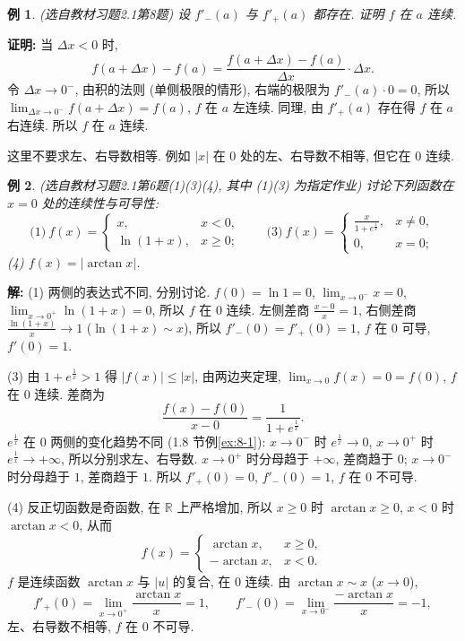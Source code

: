 \documentclass[UTF8,openany]{ctexbook}
\theoremstyle{chinesetextbook}
\newtheorem{example}{例}[section]
\newenvironment{cnproof}{\par\indent\textbf{证明:} \ignorespaces}{\par}
\newenvironment{cnsolution}{\par\indent\textbf{解:} \ignorespaces}{\par}
\begin{document}
\begin{example}\label{ex:c2-h1-8}
\textnormal{(选自教材习题2.1第8题)} 设 $f'_-(a)$ 与 $f'_+(a)$ 都存在. 证明 $f$ 在 $a$ 连续.
\end{example}
\begin{cnproof}
当 $\Delta x<0$ 时,
\[
f(a+\Delta x)-f(a)=\frac{f(a+\Delta x)-f(a)}{\Delta x}\cdot\Delta x.
\]
令 $\Delta x\to0^-$, 由积的法则 (单侧极限的情形), 右端的极限为 $f'_-(a)\cdot0=0$, 所以 $\displaystyle\lim_{\Delta x\to0^-}f(a+\Delta x)=f(a)$, $f$ 在 $a$ 左连续. 同理, 由 $f'_+(a)$ 存在得 $f$ 在 $a$ 右连续. 所以 $f$ 在 $a$ 连续.
\end{cnproof}
这里不要求左、右导数相等. 例如 $|x|$ 在 $0$ 处的左、右导数不相等, 但它在 $0$ 连续.
\begin{example}\label{ex:c2-h1-6}
\textnormal{(选自教材习题2.1第6题(1)(3)(4), 其中 (1)(3) 为指定作业)} 讨论下列函数在 $x=0$ 处的连续性与可导性:
\[
\text{(1)}\ f(x)=\begin{cases}x,&x<0,\\\ln(1+x),&x\ge0;\end{cases}\qquad\text{(3)}\ f(x)=\begin{cases}\frac x{1+e^{\frac1x}},&x\ne0,\\0,&x=0;\end{cases}
\]
(4) $f(x)=|\arctan x|$.
\end{example}
\begin{cnsolution}
(1) 两侧的表达式不同, 分别讨论. $f(0)=\ln1=0$, $\displaystyle\lim_{x\to0^-}x=0$, $\displaystyle\lim_{x\to0^+}\ln(1+x)=0$, 所以 $f$ 在 $0$ 连续. 左侧差商 $\displaystyle\frac{x-0}x=1$, 右侧差商 $\displaystyle\frac{\ln(1+x)}x\to1$ ($\ln(1+x)\sim x$), 所以 $f'_-(0)=f'_+(0)=1$, $f$ 在 $0$ 可导, $f'(0)=1$.

(3) 由 $1+e^{\frac1x}>1$ 得 $|f(x)|\le|x|$, 由两边夹定理, $\displaystyle\lim_{x\to0}f(x)=0=f(0)$, $f$ 在 $0$ 连续. 差商为
\[
\frac{f(x)-f(0)}{x-0}=\frac1{1+e^{\frac1x}}.
\]
$e^{\frac1x}$ 在 $0$ 两侧的变化趋势不同 (1.8 节例\ref{ex:8-1}): $x\to0^-$ 时 $e^{\frac1x}\to0$, $x\to0^+$ 时 $e^{\frac1x}\to+\infty$, 所以分别求左、右导数. $x\to0^+$ 时分母趋于 $+\infty$, 差商趋于 $0$; $x\to0^-$ 时分母趋于 $1$, 差商趋于 $1$. 所以 $f'_+(0)=0$, $f'_-(0)=1$, $f$ 在 $0$ 不可导.

(4) 反正切函数是奇函数, 在 $\mathbb R$ 上严格增加, 所以 $x\ge0$ 时 $\arctan x\ge0$, $x<0$ 时 $\arctan x<0$, 从而
\[
f(x)=\begin{cases}\arctan x,&x\ge0,\\-\arctan x,&x<0.\end{cases}
\]
$f$ 是连续函数 $\arctan x$ 与 $|u|$ 的复合, 在 $0$ 连续. 由 $\arctan x\sim x$ ($x\to0$),
\[
f'_+(0)=\lim_{x\to0^+}\frac{\arctan x}x=1,\qquad f'_-(0)=\lim_{x\to0^-}\frac{-\arctan x}x=-1,
\]
左、右导数不相等, $f$ 在 $0$ 不可导.
\end{cnsolution}
\end{document}
